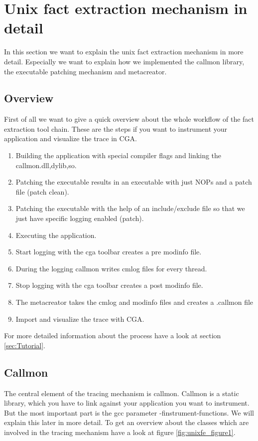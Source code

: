 \section{Unix fact extraction mechanism in detail}

In this section we want to explain the unix fact extraction mechanism in more detail. Especially we want to explain how we implemented the callmon library, the executable patching mechanism and metacreator.

\subsection{Overview}

First of all we want to give a quick overview about the whole workflow of the fact extraction tool chain. These are the steps if you want to instrument your application and visualize the trace in CGA.

\begin{enumerate}
	\item Building the application with special compiler flags and linking the callmon.{dll,dylib,so}.
	\item Patching the executable results in an executable with just NOPs and a patch file (patch clean).
	\item Patching the executable with the help of an include/exclude file so that we just have specific logging enabled (patch).
	\item Executing the application.
	\item Start logging with the cga toolbar creates a pre modinfo file.
	\item During the logging callmon writes cmlog files for every thread.
	\item Stop logging with the cga toolbar creates a post modinfo file.
	\item The metacreator takes the cmlog and modinfo files and creates a .callmon file
	\item Import and visualize the trace with CGA.
\end{enumerate}

For more detailed information about the process have a look at section \ref{sec:Tutorial}.

\subsection{Callmon}

The central element of the tracing mechanism is callmon. Callmon is a static library, which you have to link against your application you want to instrument. But the most important part is the gcc parameter -finstrument-functions. We will explain this later in more detail. To get an overview about the classes which are involved in the tracing mechanism have a look at figure \ref{fig:unixfe_figure1}.\\

